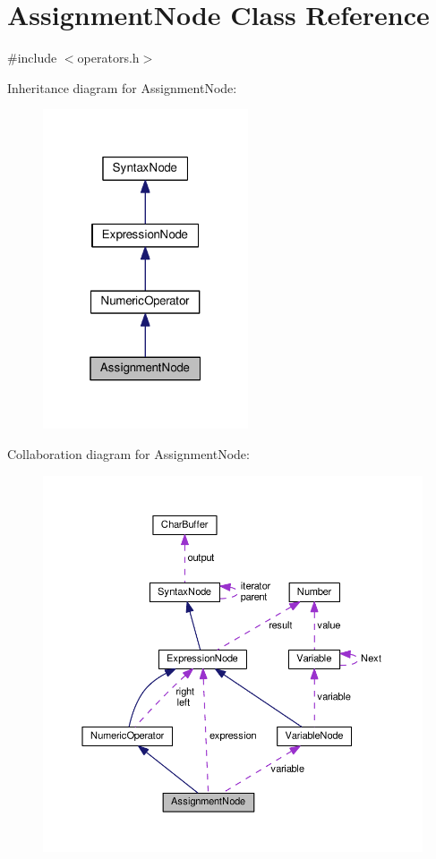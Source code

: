\hypertarget{classAssignmentNode}{}\section{Assignment\+Node Class Reference}
\label{classAssignmentNode}


{\ttfamily \#include $<$operators.\+h$>$}



Inheritance diagram for Assignment\+Node\+:
\nopagebreak
\begin{figure}[H]
\begin{center}
\leavevmode
\includegraphics[width=172pt]{df/df2/classAssignmentNode__inherit__graph}
\end{center}
\end{figure}


Collaboration diagram for Assignment\+Node\+:
\nopagebreak
\begin{figure}[H]
\begin{center}
\leavevmode
\includegraphics[width=350pt]{d3/d55/classAssignmentNode__coll__graph}
\end{center}
\end{figure}
